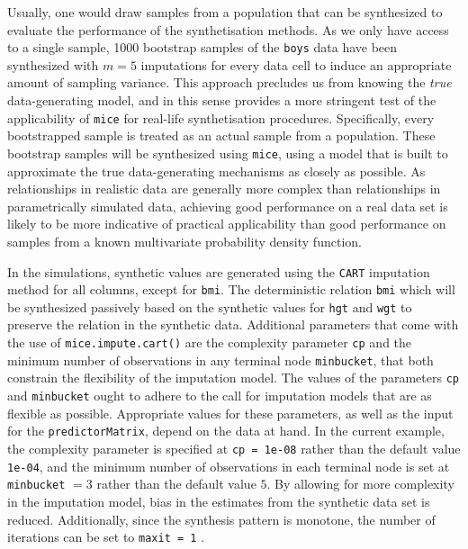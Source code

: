 \documentclass[psych,article,submit,moreauthors,pdftex]{mdpi}
\begin{document}
Usually, one would draw samples from a population that can be
synthesized to evaluate the performance of the synthetisation methods.
As we only have access to a single sample, 1000 bootstrap samples of the
\texttt{boys} data have been synthesized with \(m = 5\) imputations for
every data cell to induce an appropriate amount of sampling variance.
This approach precludes us from knowing the \emph{true} data-generating
model, and in this sense provides a more stringent test of the
applicability of \texttt{mice} for real-life synthetisation procedures.
Specifically, every bootstrapped sample is treated as an actual sample
from a population. These bootstrap samples will be synthesized using
\texttt{mice}, using a model that is built to approximate the true
data-generating mechanisms as closely as possible. As relationships in
realistic data are generally more complex than relationships in
parametrically simulated data, achieving good performance on a real data
set is likely to be more indicative of practical applicability than good
performance on samples from a known multivariate probability density
function.

In the simulations, synthetic values are generated using the
\texttt{CART} imputation method for all columns, except for
\texttt{bmi}. The deterministic relation \texttt{bmi} which will be
synthesized passively based on the synthetic values for \texttt{hgt} and
\texttt{wgt} to preserve the relation in the synthetic data. Additional
parameters that come with the use of \texttt{mice.impute.cart()} are the
complexity parameter \texttt{cp} and the minimum number of observations
in any terminal node \texttt{minbucket}, that both constrain the
flexibility of the imputation model. The values of the parameters
\texttt{cp} and \texttt{minbucket} ought to adhere to the call for
imputation models that are as flexible as possible. Appropriate values
for these parameters, as well as the input for the
\texttt{predictorMatrix}, depend on the data at hand. In the current
example, the complexity parameter is specified at \texttt{cp\ =\ 1e-08}
rather than the default value \texttt{1e-04}, and the minimum number of
observations in each terminal node is set at \texttt{minbucket} \(= 3\)
rather than the default value \(5\). By allowing for more complexity in
the imputation model, bias in the estimates from the synthetic data set
is reduced. Additionally, since the synthesis pattern is monotone, the
number of iterations can be set to \texttt{maxit\ =\ 1}
\citep[e.g.,][Ch. 3]{drechsler_synthetic_2011}.
\end{document}
